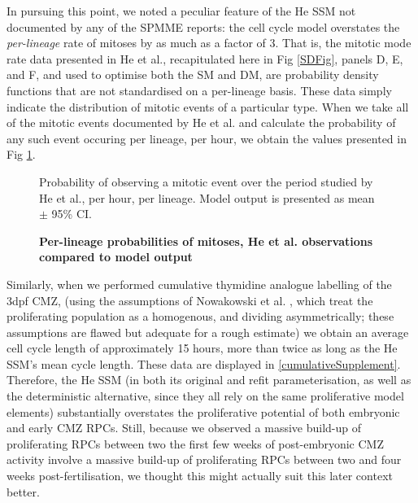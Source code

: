 \documentclass[10pt,letterpaper]{article}
\begin{document}
In pursuing this point, we noted a peculiar feature of the He SSM not documented by any of the SPMME reports: the cell cycle model overstates the  \textit{per-lineage} rate of mitoses by as much as a factor of 3. That is, the mitotic mode rate data presented in He et al., recapitulated here in Fig \ref{SDFig}, panels D, E, and F, and used to optimise both the SM and DM, are probability density functions that are not standardised on a per-lineage basis. These data simply indicate the distribution of mitotic events of a particular type. When we take all of the mitotic events documented by He et al. and calculate the probability of any such event occuring per lineage, per hour, we obtain the values presented in Fig \ref{PerLineageFig}. 

\begin{figure}[!h]
\caption{{\bf Per-lineage probabilities of mitoses, He et al. observations compared to model output}}
Probability of observing a mitotic event over the period studied by He et al., per hour, per lineage. Model output is presented as mean $\pm$ 95\% CI.
\label{PerLineageFig}
\end{figure}

Similarly, when we performed cumulative thymidine analogue labelling of the 3dpf CMZ, (using the assumptions of Nowakowski et al. \cite{Nowakowski1989}, which treat the proliferating population as a homogenous, and dividing asymmetrically; these assumptions are flawed but adequate for a rough estimate) we obtain an average cell cycle length of approximately 15 hours, more than twice as long as the He SSM's mean cycle length. These data are displayed in \ref{cumulativeSupplement}. Therefore, the He SSM (in both its original and refit parameterisation, as well as the deterministic alternative, since they all rely on the same proliferative model elements) substantially overstates the proliferative potential of both embryonic and early CMZ RPCs. Still, because we observed a massive build-up of proliferating RPCs between two the first few weeks of post-embryonic CMZ activity involve a massive build-up of proliferating RPCs between two and four weeks post-fertilisation, we thought this might actually suit this later context better.
\end{document}
